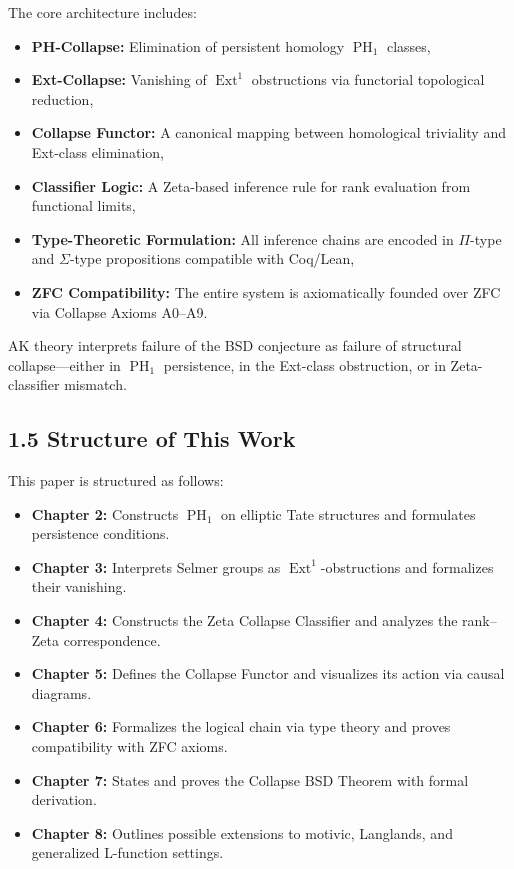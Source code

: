 \documentclass[11pt]{article}
\DeclareMathOperator{\Ext}{Ext}
\DeclareMathOperator{\PH}{PH}
\begin{document}
The core architecture includes:
\begin{itemize}
  \item \textbf{PH-Collapse:} Elimination of persistent homology $\PH_1$ classes,
  \item \textbf{Ext-Collapse:} Vanishing of $\Ext^1$ obstructions via functorial topological reduction,
  \item \textbf{Collapse Functor:} A canonical mapping between homological triviality and Ext-class elimination,
  \item \textbf{Classifier Logic:} A Zeta-based inference rule for rank evaluation from functional limits,
  \item \textbf{Type-Theoretic Formulation:} All inference chains are encoded in $\Pi$-type and $\Sigma$-type propositions compatible with Coq/Lean,
  \item \textbf{ZFC Compatibility:} The entire system is axiomatically founded over ZFC via Collapse Axioms A0–A9.
\end{itemize}

AK theory interprets failure of the BSD conjecture as failure of structural collapse—either in $\PH_1$ persistence, in the Ext-class obstruction, or in Zeta-classifier mismatch.

\subsection{1.5 Structure of This Work}

This paper is structured as follows:

\begin{itemize}
  \item \textbf{Chapter 2:} Constructs $\PH_1$ on elliptic Tate structures and formulates persistence conditions.
  \item \textbf{Chapter 3:} Interprets Selmer groups as $\Ext^1$-obstructions and formalizes their vanishing.
  \item \textbf{Chapter 4:} Constructs the Zeta Collapse Classifier and analyzes the rank–Zeta correspondence.
  \item \textbf{Chapter 5:} Defines the Collapse Functor and visualizes its action via causal diagrams.
  \item \textbf{Chapter 6:} Formalizes the logical chain via type theory and proves compatibility with ZFC axioms.
  \item \textbf{Chapter 7:} States and proves the Collapse BSD Theorem with formal derivation.
  \item \textbf{Chapter 8:} Outlines possible extensions to motivic, Langlands, and generalized L-function settings.
\end{itemize}
\end{document}
